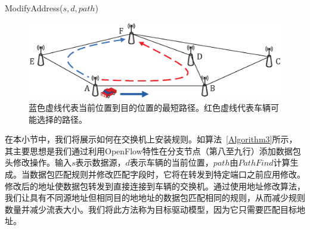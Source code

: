 \begin{algorithm}[t]
\caption{ModifyAddress($s,d,path$)}
\label{Algorithm3}
\begin{algorithmic}[1]

\end{algorithmic}
\vspace{-0.06in}
\end{algorithm}

\vspace{-0.05in}

\begin{figure} [t]
\begin{center}
\includegraphics[width=0.9\columnwidth]{figures/fig-5-31.eps}
\caption{蓝色虚线代表当前位置到目的位置的最短路径。红色虚线代表车辆可能选择的路径。} \label{fig5}
\end{center}
\vspace{-0.3in}
\end{figure}

在本小节中，我们将展示如何在交换机上安装规则。如算法~\ref{Algorithm3}所示，其主要思想是我们通过利用OpenFlow特性在分支节点（第八至九行）添加数据包头修改操作。输入$s$表示数据源，$d$表示车辆的当前位置，$path$由$PathFind$计算生成。当数据包匹配规则并修改匹配字段时，它将在转发到特定端口之前应用修改。修改后的地址使数据包转发到直接连接到车辆的交换机。通过使用地址修改算法，我们让具有不同源地址但相同目的地地址的数据包匹配相同的规则，从而减少规则数量并减少流表大小。我们将此方法称为目标驱动模型，因为它只需要匹配目标地址。

